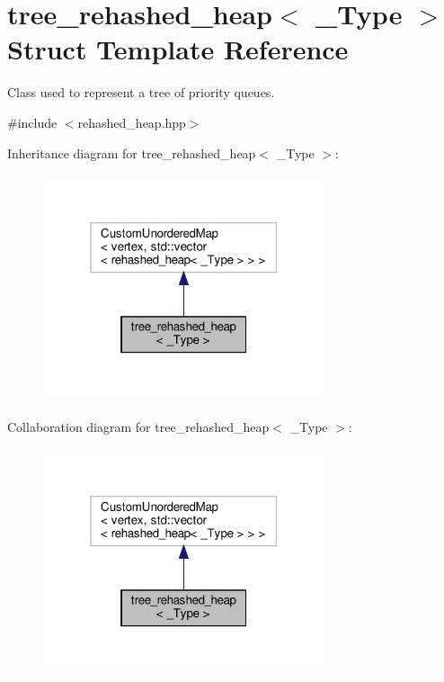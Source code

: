 \hypertarget{structtree__rehashed__heap}{}\section{tree\+\_\+rehashed\+\_\+heap$<$ \+\_\+\+Type $>$ Struct Template Reference}
\label{structtree__rehashed__heap}


Class used to represent a tree of priority queues.  




{\ttfamily \#include $<$rehashed\+\_\+heap.\+hpp$>$}



Inheritance diagram for tree\+\_\+rehashed\+\_\+heap$<$ \+\_\+\+Type $>$\+:
\nopagebreak
\begin{figure}[H]
\begin{center}
\leavevmode
\includegraphics[width=235pt]{dc/d35/structtree__rehashed__heap__inherit__graph}
\end{center}
\end{figure}


Collaboration diagram for tree\+\_\+rehashed\+\_\+heap$<$ \+\_\+\+Type $>$\+:
\nopagebreak
\begin{figure}[H]
\begin{center}
\leavevmode
\includegraphics[width=235pt]{d4/d97/structtree__rehashed__heap__coll__graph}
\end{center}
\end{figure}
